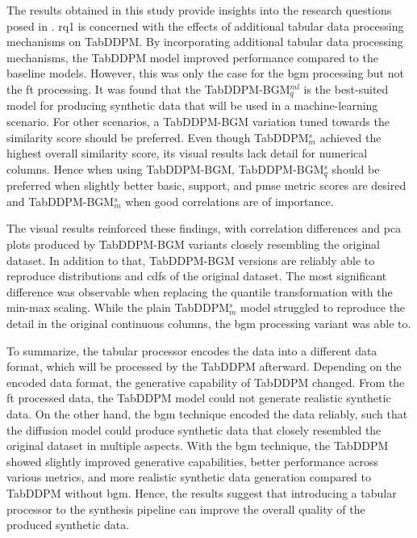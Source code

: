 The results obtained in this study provide insights into the research questions posed in .
\gls{rq}1 is concerned with the effects of additional tabular data processing mechanisms on TabDDPM.
By incorporating additional tabular data processing mechanisms, the TabDDPM \gls{model} improved performance compared to the baseline models.
However, this was only the case for the \gls{bgm} processing but not the \gls{ft} processing.
It was found that the TabDDPM-BGM$^{ml}_q$ is the best-suited \gls{model} for producing synthetic data that will be used in a machine-learning scenario.
For other scenarios, a TabDDPM-BGM variation tuned towards the similarity score should be preferred.
Even though TabDDPM$^{s}_m$ achieved the highest overall similarity score, its visual results lack detail for numerical columns.
Hence when using TabDDPM-BGM, TabDDPM-BGM$^{s}_q$ should be preferred when slightly better basic, support, and \gls{pmse} metric scores are desired and TabDDPM-BGM$^{s}_m$ when good correlations are of importance.

The visual results reinforced these findings, with correlation differences and \gls{pca} plots produced by TabDDPM-BGM variants closely resembling the original dataset.
In addition to that, TabDDPM-BGM versions are reliably able to reproduce distributions and \glspl{cdf} of the original dataset.
The most significant difference was observable when replacing the quantile transformation with the min-max scaling.
While the plain TabDDPM$^s_m$ \gls{model} struggled to reproduce the detail in the original continuous columns, the \gls{bgm} processing variant was able to.

To summarize, the tabular processor encodes the data into a different data format, which will be processed by the TabDDPM afterward.
Depending on the encoded data format, the generative capability of TabDDPM changed.
From the \gls{ft} processed data, the TabDDPM \gls{model} could not generate realistic synthetic data.
On the other hand, the \gls{bgm} technique encoded the data reliably, such that the diffusion \gls{model} could produce synthetic data that closely resembled the original dataset in multiple aspects.
With the \gls{bgm} technique, the TabDDPM showed slightly improved generative capabilities, better performance across various metrics, and more realistic synthetic data generation compared to TabDDPM without \gls{bgm}.
Hence, the results suggest that introducing a tabular processor to the synthesis pipeline can improve the overall quality of the produced synthetic data.
\newpage

